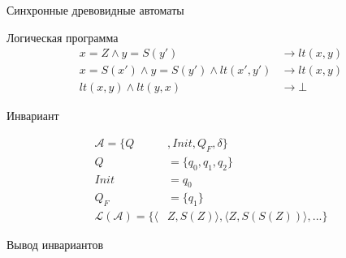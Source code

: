 \documentclass{beamer}
\newcommand{\tuple}[1]{\langle #1 \rangle}
\newcommand{\aut}{\mathcal{A}}
\begin{document}
\begin{frame}{Синхронные древовидные автоматы}
\begin{block}{Логическая программа}
\vspace{-1em}
\begin{align*}
x = Z \wedge y = S(y') &\to lt(x, y)\\
x = S(x') \wedge y = S(y') \wedge lt(x', y') &\to lt(x, y)\\
lt(x, y) \wedge lt(y, x) &\to \bot
\end{align*}
\end{block}

\begin{block}{Инвариант}
\begin{minipage}{0.4\linewidth}
\vspace{-1em}
    \begin{align*}
    \aut = \{Q&, Init, Q_F, \delta\}\\
        Q &= \{q_0, q_1, q_2\} \\
        Init &= q_0\\
        Q_F &= \{q_1\}\\
        \mathcal{L}(\aut) = \{\tuple{&Z, S(Z)}, \tuple{Z, S(S(Z))}, ...\}
    \end{align*}

\end{minipage}
\begin{minipage}{0.4\linewidth}
\vspace{1em}
\ltAutomaton
\end{minipage}
\end{block}
\end{frame}





\begin{frame}{Вывод инвариантов}
\workflow

\end{frame}
\end{document}
